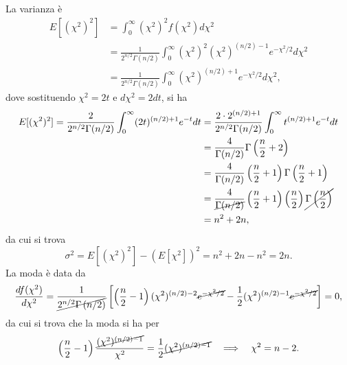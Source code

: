 \documentclass{article}
\theoremstyle{remark}
\begin{document}
La varianza è
\begin{equation}
    \begin{split}
        E[(\chi^2)^2]&=\int_0^\infty(\chi^2)^2f(\chi^2)d\chi^2 \\
        &=\frac{1}{2^{n/2}\Gamma(n/2)}\int_0^\infty(\chi^2)^2(\chi^2)^{(n/2) - 1}e^{-\chi^2/2}d\chi^2 \\
        &=\frac{1}{2^{n/2}\Gamma(n/2)}\int_0^\infty(\chi^2)^{(n/2)+1}e^{-\chi^2/2}d\chi^2,
    \end{split}
\end{equation}
dove sostituendo $\chi^2=2t$ e $d\chi^2=2dt$, si ha
\begin{equation}
    \begin{split}
        E[(\chi^2)^2] =\frac{2}{2^{n/2}\Gamma(n/2)}\int_0^\infty(2t)^{(n/2)+1}e^{-t}dt &=\frac{2\cdot2^{(n/2)+1}}{2^{n/2}\Gamma(n/2)}\int_0^\infty t^{(n/2)+1}e^{-t}dt\\
        &=\frac{4}{\Gamma(n/2)}\Gamma\left(\frac{n}{2}+2\right) \\
        &=\frac{4}{\Gamma(n/2)}\left(\frac{n}{2}+1\right)\Gamma\left(\frac{n}{2}+1\right) \\
        &=\frac{4}{\cancel{\Gamma(n/2)}}\left(\frac{n}{2}+1\right)\left(\frac{n}{2}\right)\cancel{\Gamma\left(\frac{n}{2}\right)} \\
        &=n^2+2n,
    \end{split}
\end{equation}
da cui si trova
\begin{equation}
    \sigma^2=E[(\chi^2)^2]-(E[\chi^2])^2=n^2+2n-n^2=2n.
\end{equation}
La moda è data da 
\begin{equation}
    \frac{df(\chi^2)}{d\chi^2}=\frac{1}{\cancel{2^{n/2}\Gamma\left(n/2\right)}}\left[\left(\frac{n}{2}-1\right)(\chi^2)^{(n/2) - 2}\cancel{e^{-\chi^2/2}}-\frac{1}{2}(\chi^2)^{(n/2) - 1}\cancel{e^{-\chi^2/2}}\right]=0,
\end{equation}
da cui si trova che la moda si ha per 
\begin{equation}
        \left(\frac{n}{2}-1\right)\frac{\cancel{(\chi^2)^{(n/2) - 1}}}{\chi^2}=\frac{1}{2}\cancel{(\chi^2)^{(n/2) - 1}} \quad \Longrightarrow \quad \chi^2=n-2.
\end{equation}
\end{document}
